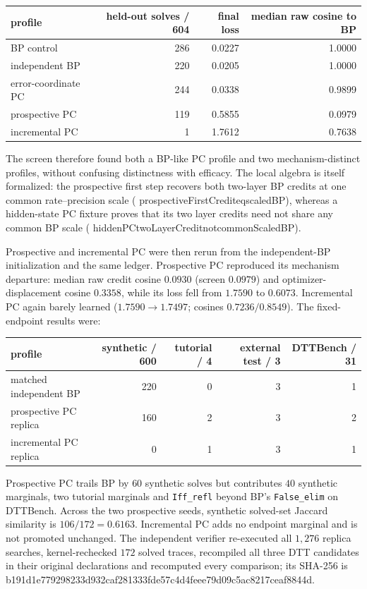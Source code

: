 \documentclass[11pt]{article}
\newcommand{\code}[1]{\texttt{#1}}
\newcommand{\leanname}[1]{{\scriptsize\ttfamily
  \def\_{\textunderscore\allowbreak}#1}}
\begin{document}
\begin{center}\small
\begin{tabular}{@{}lrrr@{}}
\toprule
profile & held-out solves / 604 & final loss & median raw cosine to BP \\
\midrule
BP control & 286 & 0.0227 & 1.0000 \\
independent BP & 220 & 0.0205 & 1.0000 \\
error-coordinate PC & 244 & 0.0338 & 0.9899 \\
prospective PC & 119 & 0.5855 & 0.0979 \\
incremental PC & 1 & 1.7612 & 0.7638 \\
\bottomrule
\end{tabular}
\end{center}

The screen therefore found both a BP-like PC profile and two mechanism-distinct
profiles, without confusing distinctness with efficacy. The local algebra is itself
formalized: the prospective first step recovers both two-layer BP credits at one common
rate--precision scale
(\leanname{prospectiveFirstCredit\_eq\_scaledBP}),
whereas a hidden-state PC fixture proves that its two layer credits need not share any
common BP scale
(\leanname{hiddenPC\_twoLayerCredit\_not\_commonScaledBP}).

Prospective and incremental PC were then rerun from the independent-BP initialization
and the same ledger. Prospective PC reproduced its mechanism departure: median raw
credit cosine $0.0930$ (screen $0.0979$) and optimizer-displacement cosine $0.3358$,
while its loss fell from $1.7590$ to $0.6073$. Incremental PC again barely learned
($1.7590\to1.7497$; cosines $0.7236/0.8549$). The fixed-endpoint results were:

\begin{center}\small
\begin{tabular}{@{}lrrrr@{}}
\toprule
profile & synthetic / 600 & tutorial / 4 & external test / 3 & DTTBench / 31 \\
\midrule
matched independent BP & 220 & 0 & 3 & 1 \\
prospective PC replica & 160 & 2 & 3 & 2 \\
incremental PC replica & 0 & 1 & 3 & 1 \\
\bottomrule
\end{tabular}
\end{center}

Prospective PC trails BP by $60$ synthetic solves but contributes $40$ synthetic
marginals, two tutorial marginals and \code{Iff\_refl} beyond BP's
\code{False\_elim} on DTTBench. Across the two prospective seeds, synthetic solved-set
Jaccard similarity is $106/172=0.6163$. Incremental PC adds no endpoint marginal and is
not promoted unchanged. The independent verifier re-executed all $1{,}276$ replica
searches, kernel-rechecked $172$ solved traces, recompiled all three DTT candidates in
their original declarations and recomputed every comparison; its SHA-256 is
{\scriptsize\ttfamily
b191d1e779298233d932caf281333fde57c4d4feee79d09c5ac8217ceaf8844d}.
\end{document}
